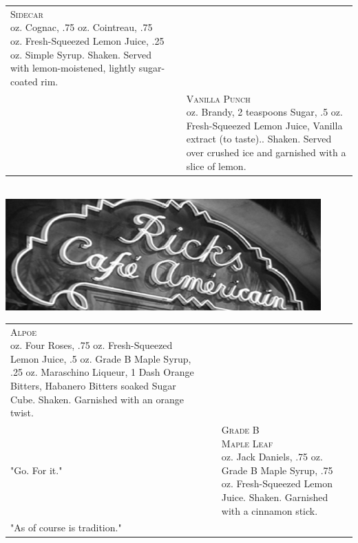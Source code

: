 \documentclass{article}
\makeatletter
\newcommand \Dotfill {\leavevmode \cleaders \hb@xt@ .25em{\hss .\hss }\hfill \kern \z@}%
\makeatother
\begin{document}
{

\begin{tabular}{m{}m{}m{}}
{\centering\Huge\textsc{Sidecar}\\*}
\centering 2 oz. Cognac, .75 oz. Cointreau, .75 oz.  Fresh-Squeezed Lemon Juice, .25 oz. Simple Syrup. Shaken. Served with lemon-moistened, lightly sugar-coated rim.\\
&
&
{\centering\Huge\textsc{Vanilla Punch}\\*}
\centering 2 oz. Brandy, 2 teaspoons Sugar, .5 oz. Fresh-Squeezed Lemon Juice, Vanilla extract (to taste).. Shaken. Served over crushed ice and garnished with a slice of lemon.\\
\end{tabular}
\\\makebox[\columnwidth]{\Huge\Dotfill}
\includegraphics[scale=1.5]{americain.png}
\\\makebox[\columnwidth]{\Huge\Dotfill}


\begin{tabular}{m{}m{}m{}}
{\centering\Huge\textsc{Alpoe}\\*}
\centering 2 oz. Four Roses, .75 oz. Fresh-Squeezed Lemon Juice, .5 oz. Grade B Maple Syrup, .25 oz.  Maraschino Liqueur, 1 Dash Orange Bitters, Habanero Bitters soaked Sugar Cube. Shaken. Garnished with an orange twist.\\
\centering\small{"Go. For it."}
&
&
{\centering\Huge\textsc{Grade B\\[-10pt] Maple Leaf}\\*}
\centering 2 oz. Jack Daniels, .75 oz. Grade B Maple Syrup, .75 oz. Fresh-Squeezed Lemon Juice. Shaken.  Garnished with a cinnamon stick.\\
\centering\small{"As of course is tradition."}
\end{tabular}
\\\makebox[\columnwidth]{\Huge\Dotfill}

}
\end{document}

